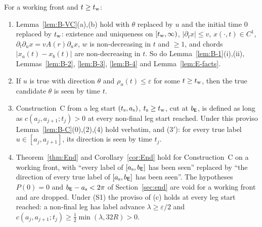 \begin{lemma}\label{lem:T2-W}
For a working front and $t\ge t_{\mathrm w}$:
\begin{enumerate}
\item[(a)] Lemma~\ref{lem:B-VC}(a),(b) hold with $\theta$ replaced by $u$ and the initial time $0$ replaced by $t_{\mathrm w}$: existence
and uniqueness on $[t_{\mathrm w},\infty)$, $|\partial_tx|\le v$, $x(\cdot,t)\in C^1$, $\partial_t\partial_ux=vA(r)\partial_ux$, $w$ is
non-decreasing in $t$ and $\ge1$, and chords $|x_a(t)-x_b(t)|$ are non-decreasing in $t$. So do Lemma~\ref{lem:B-1}(i),(ii),
Lemmas~\ref{lem:B-2}, \ref{lem:B-3}, \ref{lem:B-4} and Lemma~\ref{lem:E-facts}.
\item[(b)] If $u$ is true with direction $\theta$ and $\rho_u(t)\le\varepsilon$ for some $t\ge t_{\mathrm w}$, then the true candidate
$\theta$ is seen by time $t$.
\item[(c)] Construction~C from a leg start $(t_{\mathrm s},a_{\mathrm s})$, $t_{\mathrm s}\ge t_{\mathrm w}$, cut at $b_{\mathsf E}$, is defined as long as
$c(a_j,a_{j+1};t_j)>0$ at every non-final leg start reached. Under this proviso Lemma~\ref{lem:B-C}(0),(2),(4) hold verbatim, and
\textup{($3'$)}: for every true label $u\in[a_j,a_{j+1}]$, its direction is seen by time $t_j$.
\item[(d)] Theorem~\ref{thm:End} and Corollary~\ref{cor:End} hold for Construction~C on a working front, with ``every label of
$[a_{\mathrm s},b_{\mathsf E}]$ has been seen'' replaced by ``the direction of every true label of $[a_{\mathrm s},b_{\mathsf E}]$ has been seen''. The
hypotheses $P(0)=0$ and $b_{\mathsf E}-a_{\mathrm s}<2\pi$ of Section~\ref{sec:end} are void for a working front and are dropped. Under
\textup{(S1)} the proviso of \textup{(c)} holds at every leg start reached: a non-final leg has label advance
$\lambda\ge\varepsilon/2$ and $c(a_j,a_{j+1};t_j)\ge\frac12\min(\lambda,32R)>0$.
\end{enumerate}
\end{lemma}
